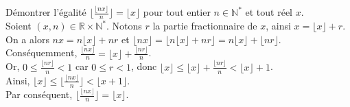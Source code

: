 \documentclass[11pt]{article}
\begin{document}
\begin{exercice}{}{}
    Démontrer l'égalité $\lfloor\frac{\lfloor{nx}\rfloor}{n}\rfloor=\lfloor{x}\rfloor$ pour tout entier $n\in\mathbb{N}^*$ et tout réel $x$.\\
    Soient $(x,n)\in\mathbb{R}\times\mathbb{N}^*$.
    \tcblower
    Notons $r$ la partie fractionnaire de $x$, ainsi $x=\lfloor{x}\rfloor+r$.\\
    On a alors $nx=n\lfloor{x}\rfloor+nr$ et $\lfloor{nx}\rfloor=\lfloor{n\lfloor{x}\rfloor+nr}\rfloor=n\lfloor{x}\rfloor+\lfloor{nr}\rfloor$.\\
    Conséquemment, $\frac{\lfloor{nx}\rfloor}{n}=\lfloor{x}\rfloor+\frac{\lfloor{nr}\rfloor}{n}$.\\
    Or, $0\leq\frac{\lfloor{nr}\rfloor}{n}<1$ car $0\leq r<1$, donc $\lfloor{x}\rfloor\leq\lfloor{x}\rfloor+\frac{\lfloor{nr}\rfloor}{n}<\lfloor{x}\rfloor+1$.\\
    Ainsi, $\lfloor{x}\rfloor\leq\lfloor\frac{\lfloor{nx}\rfloor}{n}\rfloor<\lfloor{x}+1\rfloor$.\\
    Par conséquent, $\lfloor\frac{\lfloor{nx}\rfloor}{n}\rfloor = \lfloor{x}\rfloor$.
\end{exercice}
\end{document}
